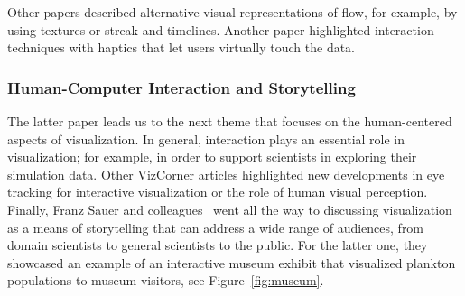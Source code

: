 \documentclass[10pt,journal,compsoc]{IEEEtran}
\begin{document}
{Other papers described alternative visual representations of flow, for example, by using textures or streak and timelines. Another paper highlighted interaction techniques with haptics that let users virtually touch the data.

\subsubsection{Human-Computer Interaction and Storytelling}


The latter paper leads us to the next theme that focuses on the human-centered aspects of visualization. In general, interaction plays an essential role in visualization; for example, in order to support scientists in exploring their simulation data. Other VizCorner articles highlighted new developments in eye tracking for interactive visualization or the role of human visual perception. Finally, Franz Sauer and colleagues~\cite{Sauer2016} went all the way to discussing visualization as a means of storytelling that can address a wide range of audiences, from domain scientists to general scientists to the public. For the latter one, they showcased an example of an interactive museum exhibit that visualized plankton populations to museum visitors, see Figure~\ref{fig:museum}.

}
\end{document}
